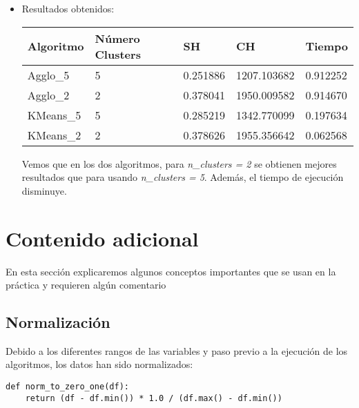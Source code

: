 \begin{itemize}
		
		\item Resultados obtenidos:
		
		\begin{table}[H]
		\centering
				\begin{tabular}{|l|l|l|l|l|}
					\hline
					\textbf{Algoritmo} & \textbf{Número Clusters} & \textbf{SH} & \textbf{CH} & \textbf{Tiempo} \\ \hline
					Agglo\_5           & 5                        & 0.251886    & 1207.103682 & 0.912252        \\ \hline
					Agglo\_2           & 2                        & 0.378041    & 1950.009582 & 0.914670        \\ \hline
					KMeans\_5          & 5                        & 0.285219    & 1342.770099 & 0.197634        \\ \hline
					KMeans\_2          & 2                        & 0.378626    & 1955.356642 & 0.062568        \\ \hline
				\end{tabular}%
			
		\end{table}
	
		Vemos que en los dos algoritmos, para \textit{n\_clusters = 2} se obtienen mejores resultados que para usando \textit{n\_clusters = 5}. Además, el tiempo de ejecución disminuye. 
		
		
	\end{itemize}

\newpage 
	\section{Contenido adicional}
	
	En esta sección explicaremos algunos conceptos importantes que se usan en la práctica y requieren algún comentario
	
	
	\subsection{Normalización}
	
	Debido a los diferentes rangos de las variables y paso previo a la ejecución de los algoritmos, los datos han sido normalizados:
	
	\begin{lstlisting}[frame=single]
def norm_to_zero_one(df):
	return (df - df.min()) * 1.0 / (df.max() - df.min())
	\end{lstlisting}
	
	
	
